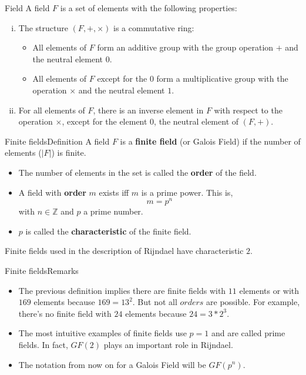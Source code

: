 \begin{frame}[t]{Field}
	A field \cite{Rijndael2020design, Paar2010understanding} $F$ is a set of elements with the following properties:
	
	\medskip
	
	\begin{enumerate}[i.]
		\item The structure $(F, +, \times)$ is a commutative ring:
			\begin{itemize}
				\item All elements of $F$ form an additive group with the group operation $+$ and the neutral element $0$.
				\item All elements of $F$ except for the $0$ form a multiplicative group with the operation $\times$ and the neutral element $1$. 
			\end{itemize}
		\item For all elements of $F$, there is an inverse element in $F$ with respect to the operation $\times$, except for the element 0, the neutral element of $(F, +)$.
	\end{enumerate}
	
\end{frame}

\begin{frame}[t]{Finite fields}{Definition}
	A field $F$ is a \textbf{finite field} (or Galois Field) if the number of elements ($|F|$) is finite. 
	
	\medskip
	
	\begin{itemize}
		\item The number of elements in the set is called the \textbf{order} of the field.
		\item A field with \textbf{order} $m$ exists iff $m$ is a prime power. This is, \[m = p^n\] with $n \in \mathbb{Z}$ and $p$ a prime number. 
		\item $p$ is called the \textbf{characteristic} of the finite field.
	\end{itemize}
	
	\bigskip
	
	Finite fields used in the description of Rijndael have characteristic $2$.
\end{frame}

\begin{frame}[t]{Finite fields}{Remarks}
	\begin{itemize}
		\item The previous definition implies there are finite fields with $11$ elements or with $169$ elements because $169 = 13^2$. But not all $orders$ are possible. For example, there's no finite field with $24$ elements because $24=3*2^3$.
		\item The most intuitive examples of finite fields use $p=1$ and are called prime fields. In fact, $GF(2)$ plays an important role in Rijndael.
		\item The notation from now on for a Galois Field will be $GF(p^n)$.
	\end{itemize}
\end{frame}





